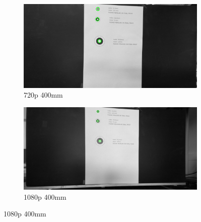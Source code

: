 \begin{figure}
    \begin{subfigure}[b]{.45\linewidth}
        \includegraphics[width=\linewidth]{bilder/project/720p400mm.png}
        \caption{720p 400mm}\label{fig:720p400mm}
    \end{subfigure}
    \begin{subfigure}[b]{.45\linewidth}
        \includegraphics[width=\linewidth]{bilder/project/1080p400mm.png}
        \caption{1080p 400mm}\label{fig:1080p400mm}
    \end{subfigure}



\end{figure}
